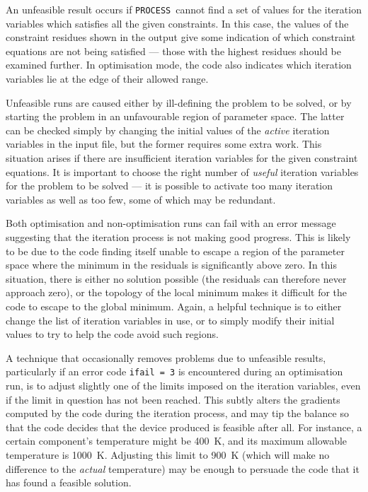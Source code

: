 \documentclass[11pt,a4paper]{report}
\newcommand{\process}{\mbox{\texttt{PROCESS}}}
\begin{document}
An unfeasible result occurs if \process\ cannot find a set of values for the
iteration variables which satisfies all the given constraints. In this case,
the values of the constraint residues shown in the output give some indication
of which constraint equations are not being satisfied --- those with the
highest residues should be examined further. In optimisation mode, the code
also indicates which iteration variables lie at the edge of their allowed
range.

Unfeasible runs are caused either by ill-defining the problem to be solved, or
by starting the problem in an unfavourable region of parameter space. The
latter can be checked simply by changing the initial values of the
\textit{active}\/ iteration variables in the input file, but the former
requires some extra work. This situation arises if there are insufficient
iteration variables for the given constraint equations. It is important to
choose the right number of \textit{useful}\/ iteration variables for the
problem to be solved --- it is possible to activate too many iteration
variables as well as too few, some of which may be redundant.

Both optimisation and non-optimisation runs can fail with an error message
suggesting that the iteration process is not making good progress. This is
likely to be due to the code finding itself unable to escape a region of the
parameter space where the minimum in the residuals is significantly above
zero. In this situation, there is either no solution possible (the residuals
can therefore never approach zero), or the topology of the local minimum makes
it difficult for the code to escape to the global minimum. Again, a helpful
technique is to either change the list of iteration variables in use, or to
simply modify their initial values to try to help the code avoid such regions.

A technique that occasionally removes problems due to unfeasible results,
particularly if an error code \texttt{ifail = 3} is encountered during an
optimisation run, is to adjust slightly one of the limits imposed on the
iteration variables, even if the limit in question has not been reached. This
subtly alters the gradients computed by the code during the iteration process,
and may tip the balance so that the code decides that the device produced is
feasible after all. For instance, a certain component's temperature might be
400~K, and its maximum allowable temperature is 1000~K\@. Adjusting this limit
to 900~K (which will make no difference to the \textit{actual}\/ temperature)
may be enough to persuade the code that it has found a feasible solution.
\end{document}
